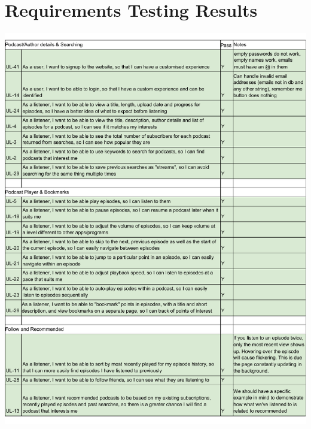 \documentclass[../report.tex]{subfiles}
\begin{document}
\newpage
\section{Requirements Testing Results} \label{app:requirements_testing}
\begin{center}
    \includegraphics[width=1.1\textwidth,page=1]{resources/testing_tables}

\end{center}
\end{document}
